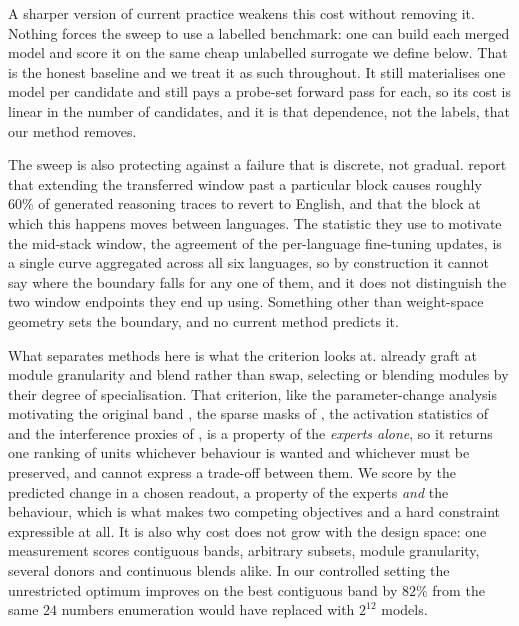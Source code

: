 \documentclass[10pt]{article}
\theoremstyle{plain}
\theoremstyle{definition}
\theoremstyle{remark}
\begin{document}
A sharper version of current practice weakens this cost without removing it.
Nothing forces the sweep to use a labelled benchmark: one can build each merged
model and score it on the same cheap unlabelled surrogate we define below. That
is the honest baseline and we treat it as such throughout. It still
materialises one model per candidate and still pays a probe-set forward pass for
each, so its cost is linear in the number of candidates, and it is that
dependence, not the labels, that our method removes.

The sweep is also protecting against a failure that is discrete, not
gradual. \citet{lasbordes2026rethinking} report that extending the transferred
window past a particular block causes roughly 60\% of generated reasoning traces
to revert to English, and that the block at which this happens moves between
languages. The statistic they use to motivate the mid-stack window, the
agreement of the per-language fine-tuning updates, is a single curve aggregated
across all six languages, so by construction it cannot say where the boundary
falls for any one of them, and it does not distinguish the two window endpoints
they end up using. Something other than weight-space geometry sets
the boundary, and no current method predicts it.

\vspace{2pt}
\begin{center}
\end{center}
\vspace{2pt}

What separates methods here is what the criterion looks at.
\citet{shin2026safetyswap} already graft at module granularity and blend rather
than swap, selecting or blending modules by their degree of specialisation. That
criterion, like the parameter-change analysis
motivating the original band \citep{bandarkar2025layerswap}, the sparse masks of
\citet{ansell2022sft}, the activation statistics of \citet{acm2025} and the
interference proxies of \citet{yadav2023ties}, is a property of the \emph{experts
alone}, so it returns one ranking of units whichever behaviour is wanted and
whichever must be preserved, and cannot express a trade-off between them. We
score by the predicted change in a chosen readout, a property of the experts
\emph{and} the behaviour, which is what makes two competing objectives and a hard
constraint expressible at all. It is also why cost does not grow with the design
space: one measurement scores contiguous bands, arbitrary subsets, module
granularity, several donors and continuous blends alike. In our controlled
setting the unrestricted optimum improves on the best contiguous band by $82\%$
from the same $24$ numbers enumeration would have replaced with $2^{12}$ models.
\end{document}
